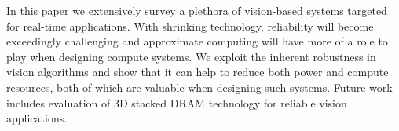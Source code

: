 In this paper we extensively survey a plethora of vision-based systems 
targeted for real-time applications. 
With shrinking technology, reliability will 
become exceedingly challenging and approximate computing will have more of a role to play when 
designing compute systems. We exploit the inherent robustness 
in vision algorithms and show that it can help to reduce both 
power and compute resources, both of which are valuable when designing such systems. Future work 
includes evaluation of 3D stacked DRAM technology for reliable vision applications.
